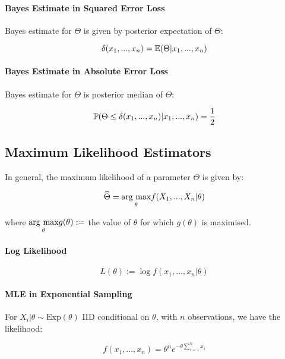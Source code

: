 \documentclass[a4paper]{article}
\begin{document}
            \paragraph{Bayes Estimate in Squared Error Loss}
                Bayes estimate for $\Theta$ is given by posterior expectation of
                $\Theta$:

                \[
                    \delta(x_1, ..., x_n) = \mathbb{E}(\Theta | x_1, ..., x_n)
                \]

            \paragraph{Bayes Estimate in Absolute Error Loss}
                Bayes estimate for $\Theta$ is posterior median of $\Theta$:

                \[
                    \mathbb{P}(\Theta \leq \delta(x_1, ..., x_n) | x_1, ..., x_n) =
                    \frac{1}{2}
                \]

        \subsection*{Maximum Likelihood Estimators}

            In general, the maximum likelihood of a parameter $\Theta$ is given
            by:

            \[
                \widehat \Theta = \underset{{\theta}}{\text{arg max}} f(X_1, ..., X_n | \theta)
            \]

            where $\underset{{\theta}}{\text{arg max}} g(\theta) :=$ the value of $\theta$ for which
            $g(\theta)$ is maximised.

            \paragraph{Log Likelihood}
                \[
                    L(\theta) := \log f(x_1, ..., x_n | \theta)
                \]

            \paragraph{MLE in Exponential Sampling}
                For $X_i | \theta \sim \text{Exp}(\theta)$ IID conditional on
                $\theta$, with $n$ observations, we have the likelihood:

                \[
                    f(x_1, ..., x_n) = \theta^n e^{-\theta \sum\limits_{i=1}^n
                    x_i}
                \]
\end{document}
